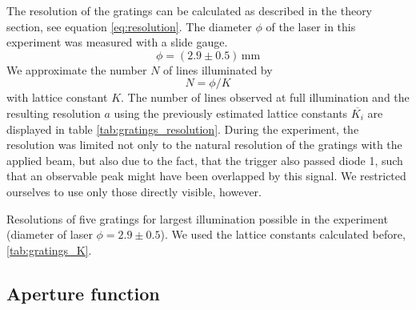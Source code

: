 The resolution of the gratings can be calculated as described in the theory section, 
see equation \eqref{eq:resolution}.
The diameter $\phi$ of the laser in this experiment was measured with a slide gauge. 
\begin{equation}
    \phi = (2.9 \pm 0.5) \, \mathrm{mm}
\end{equation}
We approximate the number $N$ of lines illuminated by
\begin{equation}
    N = \phi / K
\end{equation}
with lattice constant $K$. The number of lines observed at full illumination and the
resulting resolution $a$ using the previously estimated lattice constants $\overline{K_i}$
are displayed in table \ref{tab:gratings_resolution}. During the experiment, the resolution was 
limited not only to the natural resolution of the gratings with the applied beam, but 
also due to the fact, that the trigger also passed diode 1, such that an observable peak
might have been overlapped by this signal. We restricted ourselves to use only those
directly visible, however. 

\begin{table}[htdp]
    \centering
    
    \caption{
        Resolutions of five gratings for largest illumination possible 
        in the experiment (diameter of laser $\phi = 2.9 \pm 0.5$). 
        We used the lattice constants calculated before, \ref{tab:gratings_K}. 
        }
    \label{tab:gratings_resolution}
\end{table}


\subsection{Aperture function}

